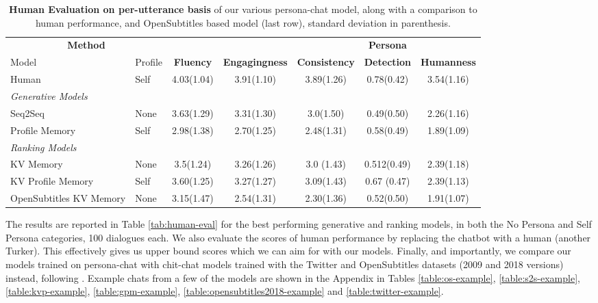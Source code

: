 \begin{table*}[t]
  \centering
  \begin{tabular}{ll|ccccc}
  \toprule
  \multicolumn{2}{c|}{{\bf Method}} & & & &  \textbf{Persona}   \\
   Model & Profile & \textbf{Fluency} &  \textbf{Engagingness} & \textbf{Consistency} & 
   \textbf{Detection}  & \textbf{Humanness} \\
  \midrule
  Human  & Self  & 4.03(1.04) & 3.91(1.10)   & 3.89(1.26) &  0.78(0.42) & 3.54(1.16)\\
  \midrule
  {\em Generative Models} & \\
  Seq2Seq & None              & 3.63(1.29)&  3.31(1.30) & 3.0(1.50) & 0.49(0.50) &2.26(1.16)\\ %
  Profile Memory   & Self   &2.98(1.38) &  2.70(1.25) & 2.48(1.31) & 0.58(0.49) &1.89(1.09) \\
  \midrule
  {\em Ranking Models} & \\
  KV Memory   & None      & 3.5(1.24) & 3.26(1.26) & 3.0 (1.43) & 0.512(0.49) & 2.39(1.18)\\ 
  KV Profile Memory   & Self & 3.60(1.25) & 3.27(1.27)  & 3.09(1.43) & 0.67 (0.47) &2.39(1.13)\\ 
  \midrule
   OpenSubtitles KV Memory & None & 3.15(1.47)  & 2.54(1.31) & 2.30(1.36)  & 0.52(0.50) &1.91(1.07)\\ 
  \bottomrule
  \end{tabular}
  \caption{{\bf Human Evaluation on per-utterance basis} of our various {\sc persona-chat} model, along with a  comparison to human performance, and OpenSubtitles based model (last row), standard deviation in parenthesis.
     \label{tab:human-eval-2}
     } 
\end{table*}
\fi

The results are reported in Table \ref{tab:human-eval} for the best performing generative and ranking models, in both the No Persona and Self Persona categories, 100 dialogues each. We also evaluate the scores of human performance by replacing the chatbot with a human (another Turker). This effectively gives us upper bound scores which we can aim for with our models. Finally, and importantly, we compare our models trained on {\sc persona-chat} with chit-chat models trained with the Twitter and OpenSubtitles datasets (2009 and 2018 versions) instead, following . Example chats from a few of the models are shown in the Appendix in
Tables \ref{table:os-example}, \ref{table:s2s-example}, \ref{table:kvp-example}, \ref{table:gpm-example},
 \ref{table:opensubtitles2018-example} and \ref{table:twitter-example}. 


